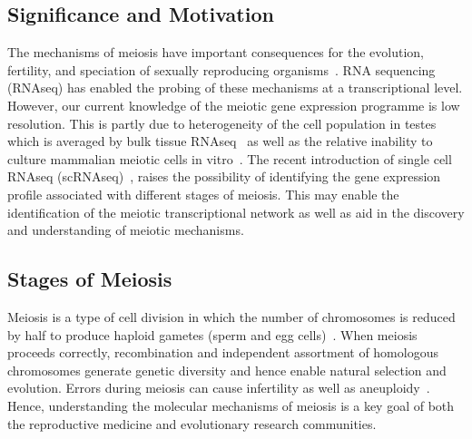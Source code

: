 \subsection{Significance and Motivation}
The mechanisms of meiosis have important consequences for the evolution, fertility, and speciation of sexually reproducing organisms~\cite{Davies2016Reengineering,Hassold2007Origin}. RNA sequencing (RNAseq) has enabled the probing of these mechanisms at a transcriptional level. However, our current knowledge of the meiotic gene expression programme is low resolution. This is partly due to heterogeneity of the cell population in testes which is averaged by bulk tissue RNAseq~\cite{YasuhiroFUJIWAR2014Differential} as well as the relative inability to culture mammalian meiotic cells in vitro~\cite{Zhou2016Complete}. The recent introduction of single cell RNAseq (scRNAseq)~\cite{Gawad2016Singlecell}, raises the possibility of identifying the gene expression profile associated with different stages of meiosis. This may enable the identification of the meiotic transcriptional network as well as aid in the discovery and understanding of meiotic mechanisms.




\subsection{Stages of Meiosis}
Meiosis is a type of cell division in which the number of chromosomes is reduced by half to produce haploid gametes (sperm and egg cells)~\cite{Ohkura2015Meiosis}. When meiosis proceeds correctly, recombination and independent assortment of homologous chromosomes generate genetic diversity and hence enable natural selection and evolution. Errors during meiosis can cause infertility as well as aneuploidy~\cite{Handel2010Genetics,Hassold2007Origin}. Hence, understanding the molecular mechanisms of meiosis is a key goal of both the reproductive medicine and evolutionary research communities.

